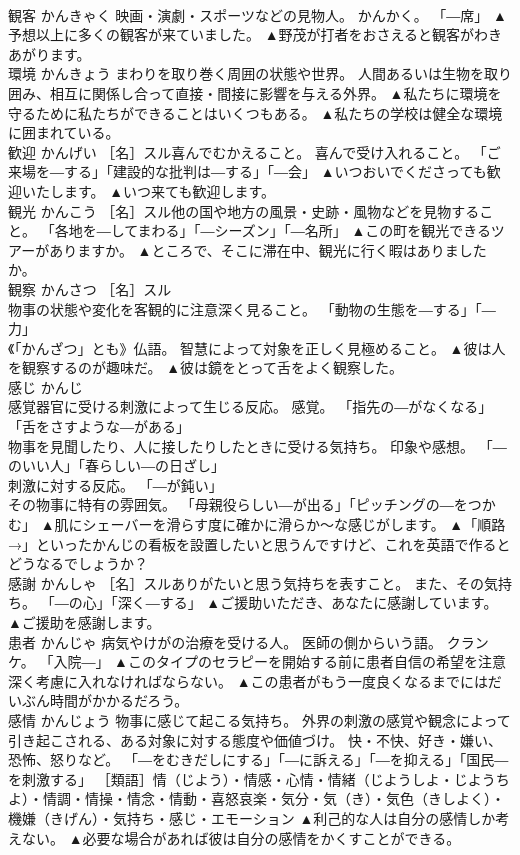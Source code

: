 \documentclass[8pt]{extreport}
\begin{document}
\begin{CJK}{UTF8}{min}
\\	観客	かんきゃく	映画・演劇・スポーツなどの見物人。 かんかく。 「―席」	▲予想以上に多くの観客が来ていました。 ▲野茂が打者をおさえると観客がわきあがります。
\\	環境	かんきょう	まわりを取り巻く周囲の状態や世界。 人間あるいは生物を取り囲み、相互に関係し合って直接・間接に影響を与える外界。	▲私たちに環境を守るために私たちができることはいくつもある。 ▲私たちの学校は健全な環境に囲まれている。
\\	歓迎	かんげい	［名］スル喜んでむかえること。 喜んで受け入れること。 「ご来場を―する」「建設的な批判は―する」「―会」	▲いつおいでくださっても歓迎いたします。 ▲いつ来ても歓迎します。
\\	観光	かんこう	［名］スル他の国や地方の風景・史跡・風物などを見物すること。 「各地を―してまわる」「―シーズン」「―名所」	▲この町を観光できるツアーがありますか。 ▲ところで、そこに滞在中、観光に行く暇はありましたか。
\\	観察	かんさつ	［名］スル 
\\	物事の状態や変化を客観的に注意深く見ること。 「動物の生態を―する」「―力」 
\\	《「かんざつ」とも》仏語。 智慧によって対象を正しく見極めること。	▲彼は人を観察するのが趣味だ。 ▲彼は鏡をとって舌をよく観察した。
\\	感じ	かんじ	
\\	感覚器官に受ける刺激によって生じる反応。 感覚。 「指先の―がなくなる」「舌をさすような―がある」 
\\	物事を見聞したり、人に接したりしたときに受ける気持ち。 印象や感想。 「―のいい人」「春らしい―の日ざし」 
\\	刺激に対する反応。 「―が鈍い」 
\\	その物事に特有の雰囲気。 「母親役らしい―が出る」「ピッチングの―をつかむ」	▲肌にシェーバーを滑らす度に確かに滑らか〜な感じがします。 ▲「順路→」といったかんじの看板を設置したいと思うんですけど、これを英語で作るとどうなるでしょうか？
\\	感謝	かんしゃ	［名］スルありがたいと思う気持ちを表すこと。 また、その気持ち。 「―の心」「深く―する」	▲ご援助いただき、あなたに感謝しています。 ▲ご援助を感謝します。
\\	患者	かんじゃ	病気やけがの治療を受ける人。 医師の側からいう語。 クランケ。 「入院―」	▲このタイプのセラピーを開始する前に患者自信の希望を注意深く考慮に入れなければならない。 ▲この患者がもう一度良くなるまでにはだいぶん時間がかかるだろう。
\\	感情	かんじょう	物事に感じて起こる気持ち。 外界の刺激の感覚や観念によって引き起こされる、ある対象に対する態度や価値づけ。 快・不快、好き・嫌い、恐怖、怒りなど。 「―をむきだしにする」「―に訴える」「―を抑える」「国民―を刺激する」 ［類語］情（じよう）・情感・心情・情緒（じようしよ・じようちよ）・情調・情操・情念・情動・喜怒哀楽・気分・気（き）・気色（きしよく）・機嫌（きげん）・気持ち・感じ・エモーション	▲利己的な人は自分の感情しか考えない。 ▲必要な場合があれば彼は自分の感情をかくすことができる。

\end{CJK}
\end{document}
